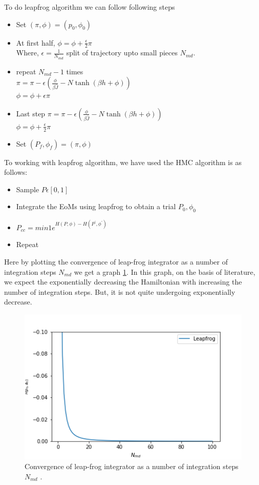 \documentclass[11pt, a4paper, DIV=12]{scrartcl}
\begin{document}
To do leapfrog algorithm we can follow following steps
\begin{itemize}
	\item Set $(\pi, \phi) = (p_{0}, \phi_{0}) $
	\item At first half, $\phi=\phi +\frac{\epsilon}{2} \pi $\\
	Where, $ \epsilon=\frac{1}{N_{md}} $ split of trajectory upto small pieces $ N_{md} $.
	\item  repeat $ N_{md} - 1$ times\\
	$ \pi=\pi -\epsilon(\frac{\phi}{\beta \hat{J}} - N \tanh (\beta h + \phi)) $\\
	$\phi=\phi +\epsilon \pi $
	\item Last step $ \pi=\pi -\epsilon(\frac{\phi}{\beta \hat{J}} - N \tanh (\beta h + \phi)) $\\
	$\phi=\phi +\frac{\epsilon}{2}\pi $
\item	Set $(P_{f}, \phi_{f}) = (\pi, \phi) $
\end{itemize}
To working with leapfrog algorithm, we have used the HMC algorithm is as follows:
\begin{itemize}
	\item Sample $ P \epsilon[0,1] $
	\item Integrate the EoMs using leapfrog to obtain a trial $ P_{0}, \phi_{0} $
	\item $P_{cc} =min{1 e^{H(P, \phi)- H(P^{\prime}, \phi^{\prime})}} $
	\item Repeat
\end{itemize}
Here by plotting the convergence of leap-frog integrator as a number of integration steps $ N_{md}$ we get a graph \ref{fig:convergence}. In this graph, on the basis of literature, we expect the exponentially decreasing the Hamiltonian with increasing the number of integration steps. But, it is not quite undergoing exponentially decrease. 
\begin{figure}[H]
	\centering
	\includegraphics[width=0.8\linewidth]{convergence.png}
	\caption{Convergence of leap-frog integrator as a number of integration steps $ N_{md}$  .}
	\label{fig:convergence}
\end{figure}
\end{document}
